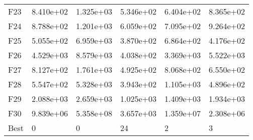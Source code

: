 \begin{tabular}{llllll}
F23  &  8.410e+02 &  1.325e+03 &  5.346e+02 &  6.404e+02 &  8.365e+02 \\
F24  &  8.788e+02 &  1.201e+03 &  6.059e+02 &  7.095e+02 &  9.264e+02 \\
F25  &  5.055e+02 &  6.959e+03 &  3.870e+02 &  6.864e+02 &  4.176e+02 \\
F26  &  4.529e+03 &  8.579e+03 &  4.038e+02 &  3.369e+03 &  5.522e+03 \\
F27  &  8.127e+02 &  1.761e+03 &  4.925e+02 &  8.068e+02 &  6.550e+02 \\
F28  &  5.547e+02 &  5.328e+03 &  3.943e+02 &  1.105e+03 &  4.896e+02 \\
F29  &  2.088e+03 &  2.659e+03 &  1.025e+03 &  1.409e+03 &  1.934e+03 \\
F30  &  9.839e+06 &  5.358e+08 &  3.657e+03 &  1.359e+07 &  2.308e+06 \\
Best &          0 &          0 &         24 &          2 &          3 \\
\bottomrule
\end{tabular}
